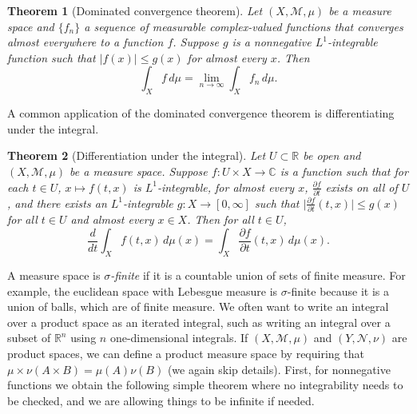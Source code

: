 \documentclass[12pt,openany]{book}
\newcommand{\sabs}[1]{\lvert {#1} \rvert}
\newcommand{\babs}[1]{\bigl\lvert {#1} \bigr\rvert}
\newcommand{\C}{{\mathbb{C}}}
\newcommand{\R}{{\mathbb{R}}}
\newcommand{\sM}{{\mathscr{M}}}
\newcommand{\sN}{{\mathscr{N}}}
\theoremstyle{plain}
\newtheorem{thm}{Theorem}[section]
\theoremstyle{remark}
\theoremstyle{definition}
\theoremstyle{exercise}
\theoremstyle{example}
\begin{document}
\begin{thm}[Dominated convergence theorem]
\pagebreak[2]
Let $(X,\sM,\mu)$ be a measure space and
$\{ f_n \}$ a sequence of measurable complex-valued functions that converges
almost everywhere to a function $f$.  Suppose $g$ is a nonnegative
$L^1$-integrable function such that $\sabs{f(x)} \leq g(x)$ for almost every
$x$.  Then
\begin{equation*}
\int_X f \, d\mu = \lim_{n\to \infty} \int_X f_n \, d\mu .
\end{equation*}
\end{thm}

A common application of the dominated convergence theorem is differentiating
under the integral.

\begin{thm}[Differentiation under the integral]
Let $U \subset \R$ be open and $(X,\sM,\mu)$ be a measure space.
Suppose $f \colon U \times X \to \C$ is a function such that
for each $t \in U$, $x \mapsto f(t,x)$ is $L^1$-integrable,
for almost every $x$, $\frac{\partial f}{\partial t}$ exists on all of $U$,
and there exists an $L^1$-integrable $g \colon X \to [0,\infty]$ such that
$\babs{\frac{\partial f}{\partial t}(t,x)} \leq g(x)$ for all $t \in U$
and almost every $x \in X$.  Then for all $t \in U$,
\begin{equation*}
\frac{d}{dt}
\int_X f(t,x) \, d\mu(x)
=
\int_X
\frac{\partial f}{\partial t}(t,x) \, d\mu(x) .
\end{equation*}
\end{thm}

A measure space is \emph{$\sigma$-finite}
if it is a countable union of sets of
finite measure.  For example, the euclidean space with Lebesgue measure
is $\sigma$-finite because it is a union of balls, which are of finite
measure.  We often want to write an integral over a product space as an
iterated integral, such as writing an integral over a subset of $\R^n$ using
$n$ one-dimensional integrals.  If
$(X,\sM,\mu)$ and $(Y,\sN,\nu)$ are product spaces, we can define a product
measure space by requiring that $\mu \times \nu (A \times B) = \mu(A)\nu(B)$
(we again skip details).  First, for nonnegative functions we obtain the
following simple theorem where no integrability needs to be checked, and we
are allowing things to be infinite if needed.
\end{document}
